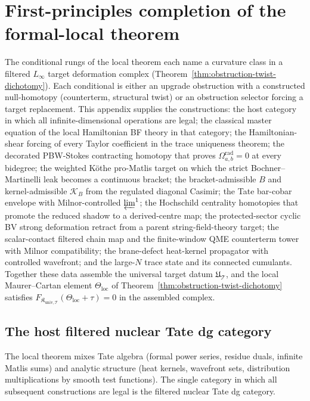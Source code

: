 \section{First-principles completion of the formal-local theorem}
\label{app:completion-blueprint}

The conditional rungs of the local theorem each name a curvature class
in a filtered \(L_\infty\) target deformation complex
(Theorem~\ref{thm:obstruction-twist-dichotomy}).  Each conditional is
either an upgrade obstruction with a constructed null-homotopy
(counterterm, structural twist) or an obstruction selector forcing a target
replacement.  This appendix supplies the constructions: the host
category in which all infinite-dimensional operations are legal; the
classical master equation of the local Hamiltonian BF theory in that
category; the Hamiltonian-shear forcing of every Taylor coefficient in
the trace uniqueness theorem; the decorated PBW-Stokes contracting
homotopy that proves \(\Omega^{\mathrm{rad}}_{a,b}=0\) at every
bidegree; the weighted K\"othe pro-Matlis target on which the strict
Bochner--Martinelli leak becomes a continuous bracket; the
bracket-admissible \(B\) and kernel-admissible \(\mathcal K_B\) from the
regulated diagonal Casimir; the Tate bar-cobar envelope with
Milnor-controlled \(\varprojlim^1\); the Hochschild centrality
homotopies that promote the reduced shadow to a derived-centre map;
the protected-sector cyclic BV strong deformation retract from a
parent string-field-theory target; the scalar-contact filtered chain
map and the finite-window QME counterterm tower with Milnor
compatibility; the brane-defect heat-kernel propagator with controlled
wavefront; and the large-\(N\) trace state and its connected
cumulants.  Together these data assemble the universal target datum
\(\mathfrak U_{\mathcal T}\), and the local Maurer--Cartan element
\(\Theta_{\mathrm{loc}}\) of
Theorem~\ref{thm:obstruction-twist-dichotomy} satisfies
\(F_{\mathfrak K_{\mathrm{univ},\mathcal T}}(\Theta_{\mathrm{loc}}+\tau)=0\)
in the assembled complex.

\subsection{The host filtered nuclear Tate dg category}
\label{ssec:completion-host-category}

The local theorem mixes Tate algebra (formal power series, residue
duals, infinite Matlis sums) and analytic structure (heat kernels,
wavefront sets, distribution multiplications by smooth test functions).
The single category in which all subsequent constructions are legal is
the filtered nuclear Tate dg category.

